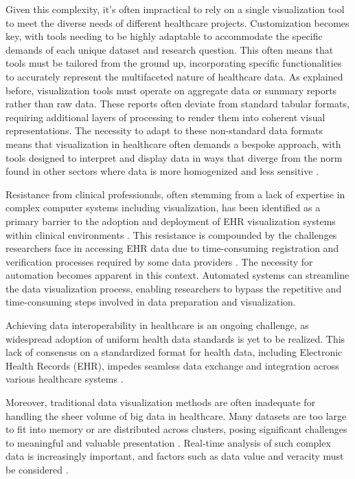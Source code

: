 Given this complexity, it's often impractical to rely on a single visualization tool to meet the diverse needs of different healthcare projects. Customization becomes key, with tools needing to be highly adaptable to accommodate the specific demands of each unique dataset and research question. This often means that tools must be tailored from the ground up, incorporating specific functionalities to accurately represent the multifaceted nature of healthcare data.
As explained before, visualization tools must operate on aggregate data or summary reports rather than raw data. These reports often deviate from standard tabular formats, requiring additional layers of processing to render them into coherent visual representations. The necessity to adapt to these non-standard data formats means that visualization in healthcare often demands a bespoke approach, with tools designed to interpret and display data in ways that diverge from the norm found in other sectors where data is more homogenized and less sensitive \cite{soa12}\cite{soa13}.

Resistance from clinical professionals, often stemming from a lack of expertise in complex computer systems including visualization, has been identified as a primary barrier to the adoption and deployment of EHR visualization systems within clinical environments \cite{soa14}. This resistance is compounded by the challenges researchers face in accessing EHR data due to time-consuming registration and verification processes required by some data providers \cite{soa15}. The necessity for automation becomes apparent in this context. Automated systems can streamline the data visualization process, enabling researchers to bypass the repetitive and time-consuming steps involved in data preparation and visualization.

Achieving data interoperability in healthcare is an ongoing challenge, as widespread adoption of uniform health data standards is yet to be realized. This lack of consensus on a standardized format for health data, including Electronic Health Records (EHR), impedes seamless data exchange and integration across various healthcare systems \cite{soa21}.

Moreover, traditional data visualization methods are often inadequate for handling the sheer volume of big data in healthcare. Many datasets are too large to fit into memory or are distributed across clusters, posing significant challenges to meaningful and valuable presentation \cite{soa13}. Real-time analysis of such complex data is increasingly important, and factors such as data value and veracity must be considered \cite{soa13}.


